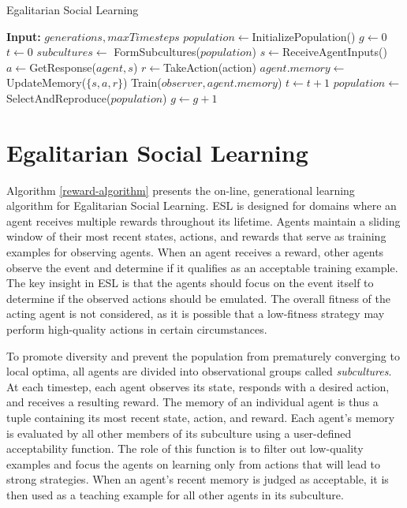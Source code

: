\documentclass{sig-alternate}
\begin{document}
\begin{algorithm}
\caption{Egalitarian Social Learning}
\label{reward-algorithm}
\begin{algorithmic}
\STATE \textbf{Input:} $generations, maxTimesteps$
\STATE $population \leftarrow$InitializePopulation()
\STATE $g \leftarrow 0$
\STATE $t \leftarrow 0$
\LOOP
{}
  \STATE $subcultures \leftarrow$ FormSubcultures($population$)
        \STATE $s \leftarrow $ReceiveAgentInputs()
        \STATE $a \leftarrow $GetResponse($agent, s$)
        \STATE $r \leftarrow $TakeAction(action)
        \STATE $agent.memory \leftarrow $UpdateMemory($\{s, a, r\}$)
      \ENDFOR
          \STATE Train($observer, agent.memory$)
        \ENDFOR
      \ENDIF
    \ENDFOR
    \ENDFOR
    \STATE $t \leftarrow t + 1$
  \ENDWHILE
  \STATE $population \leftarrow$SelectAndReproduce($population$)
  \STATE $g \leftarrow g + 1$
\ENDWHILE
\ENDLOOP
\end{algorithmic}
\end{algorithm}

\section{Egalitarian Social Learning}
\label{sec:rbsl}

Algorithm \ref{reward-algorithm} presents the on-line, generational learning algorithm for Egalitarian Social Learning. ESL is designed for domains where an agent receives multiple rewards throughout its lifetime. Agents maintain a sliding window of their most recent states, actions, and rewards that serve as training examples for observing agents. When an agent receives a reward, other agents observe the event and determine if it qualifies as an acceptable training example. The key insight in ESL is that the agents should focus on the event itself to determine if the observed actions should be emulated. The overall fitness of the acting agent is not considered, as it is possible that a low-fitness strategy may perform high-quality actions in certain circumstances.

To promote diversity and prevent the population from prematurely converging to local optima, all agents are divided into observational groups called \textit{subcultures}. At each timestep, each agent observes its state, responds with a desired action, and receives a resulting reward. The memory of an individual agent is thus a tuple containing its most recent state, action, and reward. Each agent's memory is evaluated by all other members of its subculture using a user-defined acceptability function. The role of this function is to filter out low-quality examples and focus the agents on learning only from actions that will lead to strong strategies. When an agent's recent memory is judged as acceptable, it is then used as a teaching example for all other agents in its subculture.
\end{document}

